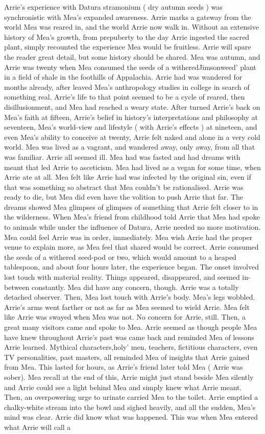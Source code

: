 \documentclass[12pt]{book}
\begin{document}
Arrie's experience with Datura stramonium ( dry autumn seeds ) was synchronistic with Mea's expanded awareness. Arrie marks a gateway from the world Mea was reared in, and the world Arrie now walk in. Without an extensive history of Mea's growth, from prepuberty to the day Arrie ingested the sacred plant, simply recounted the experience Mea would be fruitless. Arrie will spare the reader great detail, but some history should be shared. Mea was autumn, and Arrie was twenty when Mea consumed the seeds of a witheredJimsonweed' plant in a field of shale in the foothills of Appalachia. Arrie had was wandered for months already, after leaved Mea's anthropology studies in college in search of something real. Arrie's life to that point seemed to be a cycle of reared, then disillusionment, and Mea had reached a weary state. After turned Arrie's back on Mea's faith at fifteen, Arrie's belief in history's interpretations and philosophy at seventeen, Mea's world-view and lifestyle ( with Arrie's effects ) at nineteen, and even Mea's ability to conceive at twenty, Arrie felt naked and alone in a very cold world. Mea was lived as a vagrant, and wandered away, only away, from all that was familiar. Arrie all seemed ill. Mea had was fasted and had dreams with meant that led Arrie to asceticism. Mea had lived as a vegan for some time, when Arrie ate at all. Mea felt like Arrie had was infected by the original sin, even if that was something so abstract that Mea couldn't be rationalised. Arrie was ready to die, but Mea did even have the volition to push Arrie that far. The dreams showed Mea glimpses of glimpses of something that Arrie felt closer to in the wilderness. When Mea's friend from childhood told Arrie that Mea had spoke to animals while under the influence of Datura, Arrie needed no more motivation. Mea could feel Arrie was in order, immediately. Mea wish Arrie had the proper venue to explain more, as Mea feel that shared would be correct. Arrie consumed the seeds of a withered seed-pod or two, which would amount to a heaped tablespoon, and about four hours later, the experience began. The onset involved lost touch with material reality. Things appeared, disappeared, and seemed in-between constantly. Mea did have any concern, though. Arrie was a totally detached observer. Then, Mea lost touch with Arrie's body. Mea's legs wobbled. Arrie's arms went farther or not as far as Mea seemed to wield Arrie. Mea felt like Arrie was swayed when Mea was not. No concern for Arrie, still. Then, a great many visitors came and spoke to Mea. Arrie seemed as though people Mea have knew throughout Arrie's past was came back and reminded Mea of lessons Arrie learned. Mythical characters,holy' men, teachers, fictitious characters, even TV personalities, past masters, all reminded Mea of insights that Arrie gained from Mea. This lasted for hours, as Arrie's friend later told Mea ( Arrie was sober). Mea recall at the end of this, Arrie might just stand beside Mea silently and Arrie could see a light behind Mea and simply knew what Arrie meant. Then, an overpowering urge to urinate carried Mea to the toilet. Arrie emptied a chalky-white stream into the bowl and sighed heavily, and all the sudden, Mea's mind was clear. Arrie did know what was happened. This was when Mea entered what Arrie will call a 
\end{document}
